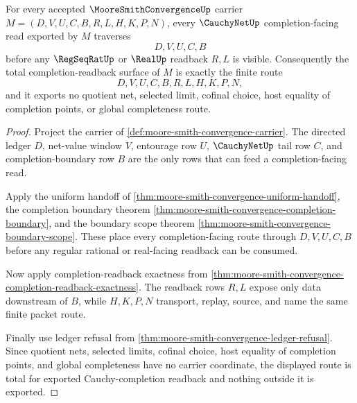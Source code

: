 \begin{theorem}
\label{thm:moore-smith-convergence-cauchy-completion-readback-totality}
For every accepted $\MooreSmithConvergenceUp$ carrier $M=(D,V,U,C,B,R,L,H,K,P,N)$, every $\CauchyNetUp$ completion-facing read exported by $M$ traverses
$$
D,V,U,C,B
$$
before any $\RegSeqRatUp$ or $\RealUp$ readback $R,L$ is visible. Consequently the total completion-readback surface of $M$ is exactly the finite route
$$
D,V,U,C,B,R,L,H,K,P,N,
$$
and it exports no quotient net, selected limit, cofinal choice, host equality of completion points, or global completeness route.
\end{theorem}
\begin{proof}
Project the carrier of \autoref{def:moore-smith-convergence-carrier}. The directed ledger $D$, net-value window $V$, entourage row $U$, $\CauchyNetUp$ tail row $C$, and completion-boundary row $B$ are the only rows that can feed a completion-facing read.

Apply the uniform handoff of \autoref{thm:moore-smith-convergence-uniform-handoff}, the completion boundary theorem \autoref{thm:moore-smith-convergence-completion-boundary}, and the boundary scope theorem \autoref{thm:moore-smith-convergence-boundary-scope}. These place every completion-facing route through $D,V,U,C,B$ before any regular rational or real-facing readback can be consumed.

Now apply completion-readback exactness from \autoref{thm:moore-smith-convergence-completion-readback-exactness}. The readback rows $R,L$ expose only data downstream of $B$, while $H,K,P,N$ transport, replay, source, and name the same finite packet route.

Finally use ledger refusal from \autoref{thm:moore-smith-convergence-ledger-refusal}. Since quotient nets, selected limits, cofinal choice, host equality of completion points, and global completeness have no carrier coordinate, the displayed route is total for exported Cauchy-completion readback and nothing outside it is exported.
\end{proof}


